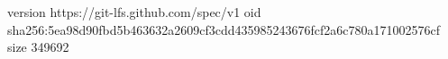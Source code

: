 version https://git-lfs.github.com/spec/v1
oid sha256:5ea98d90fbd5b463632a2609cf3cdd435985243676fcf2a6c780a171002576cf
size 349692
